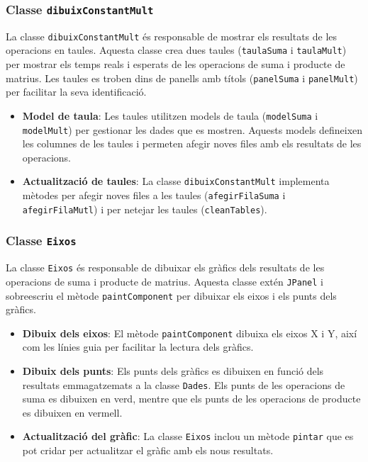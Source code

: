\documentclass{ieeetj}
\begin{document}
\subsubsection{Classe \texttt{dibuixConstantMult}}
La classe \texttt{dibuixConstantMult} és responsable de mostrar els resultats de les operacions en taules. Aquesta classe crea dues taules (\texttt{taulaSuma} i \texttt{taulaMult}) per mostrar els temps reals i esperats de les operacions de suma i producte de matrius. Les taules es troben dins de panells amb títols (\texttt{panelSuma} i \texttt{panelMult}) per facilitar la seva identificació.

\begin{itemize}
    \item \textbf{Model de taula}: Les taules utilitzen models de taula (\texttt{modelSuma} i \texttt{modelMult}) per gestionar les dades que es mostren. Aquests models defineixen les columnes de les taules i permeten afegir noves files amb els resultats de les operacions.
    \item \textbf{Actualització de taules}: La classe \texttt{dibuixConstantMult} implementa mètodes per afegir noves files a les taules (\texttt{afegirFilaSuma} i \texttt{afegirFilaMutl}) i per netejar les taules (\texttt{cleanTables}).
\end{itemize}

\subsubsection{Classe \texttt{Eixos}}
La classe \texttt{Eixos} és responsable de dibuixar els gràfics dels resultats de les operacions de suma i producte de matrius. Aquesta classe extén \texttt{JPanel} i sobreescriu el mètode \texttt{paintComponent} per dibuixar els eixos i els punts dels gràfics.

\begin{itemize}
    \item \textbf{Dibuix dels eixos}: El mètode \texttt{paintComponent} dibuixa els eixos X i Y, així com les línies guia per facilitar la lectura dels gràfics.
    \item \textbf{Dibuix dels punts}: Els punts dels gràfics es dibuixen en funció dels resultats emmagatzemats a la classe \texttt{Dades}. Els punts de les operacions de suma es dibuixen en verd, mentre que els punts de les operacions de producte es dibuixen en vermell.
    \item \textbf{Actualització del gràfic}: La classe \texttt{Eixos} inclou un mètode \texttt{pintar} que es pot cridar per actualitzar el gràfic amb els nous resultats.
\end{itemize}
\end{document}
